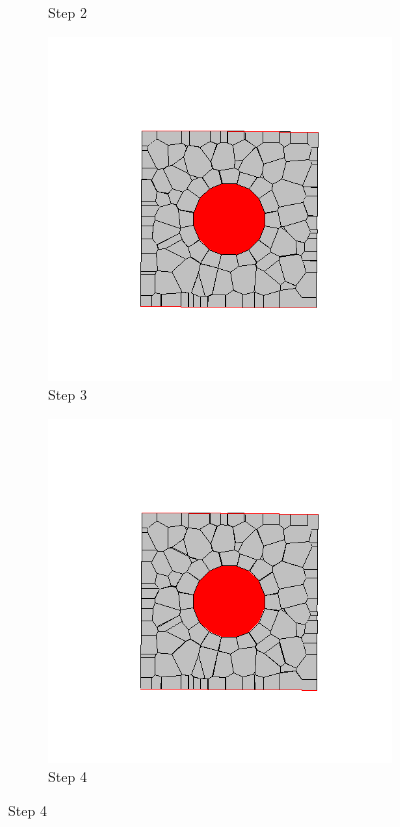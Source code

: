 \begin{figure}[ht!]
\begin{subfigure}{.25\textwidth}
      \caption{Step 2}
      \end{subfigure}%
      \begin{subfigure}{.25\textwidth}
        \centering
        \includegraphics[width=1.0\linewidth]{Files/Small_ASR/CR/DEP5-STEP(003).png}
      \caption{Step 3}
      \end{subfigure}%
      \begin{subfigure}{.25\textwidth}
        \centering
        \includegraphics[width=1.0\linewidth]{Files/Small_ASR/CR/DEP5-STEP(004).png}
      \caption{Step 4}
      \end{subfigure}


\end{figure}
